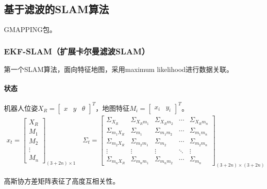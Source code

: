 \documentclass[
12pt, %
a4paper, 
oneside, %
headinclude,footinclude, %
]{scrartcl}
\begin{document}
\subsection[基于滤波的SLAM算法]{基于滤波的SLAM算法}
GMAPPING包。
\subsubsection[EKF-SLAM]{EKF-SLAM（扩展卡尔曼滤波SLAM）}
第一个SLAM算法，面向特征地图，采用maximum likelihood进行数据关联。
\paragraph{状态}
机器人位姿$ X_R = \begin{bmatrix} x & y & \theta \end{bmatrix}^T $，地图特征$ M_i = \begin{bmatrix} x_i & y_i \end{bmatrix}^T $。
\begin{align*}
x_t = \begin{bmatrix} X_R \\ M_1 \\ M_2 \\ \vdots \\ M_n \end{bmatrix}_{(3 + 2n) \times 1} \quad 
\Sigma_t = \begin{bmatrix} 
\Sigma_{X_R} & \Sigma_{X_R m_1} & \Sigma_{X_R m_2} & \cdots & \Sigma_{X_R m_n} \\
\Sigma_{m_1 X_R} & \Sigma_{m_1} & \Sigma_{m_1 m_2} & \cdots & \Sigma_{m_1 m_n} \\
\Sigma_{m_2 X_R} & \Sigma_{m_2 m_1} & \Sigma_{m_2} & \cdots & \Sigma_{m_2 m_n} \\
\vdots & \vdots & \vdots & \ddots & \vdots \\
\Sigma_{m_n X_R} & \Sigma_{m_n m_1} & \Sigma_{m_n m_2} & \cdots & \Sigma_{m_n}
\end{bmatrix}_{(3 + 2n) \times (3 + 2n)}
\end{align*}

高斯协方差矩阵表征了高度互相关性。
\end{document}
